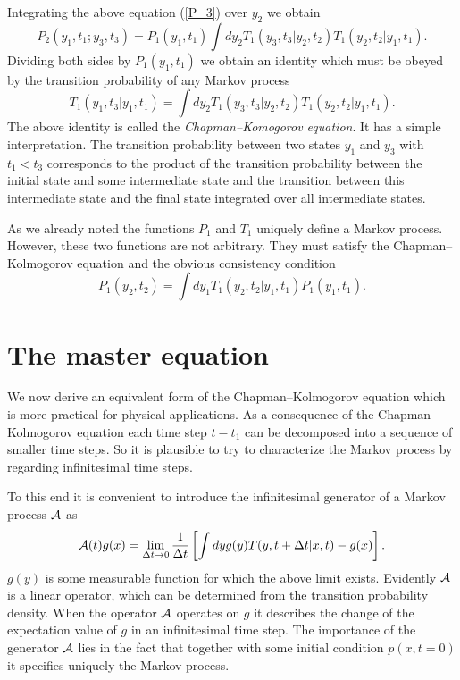 Integrating the above equation (\ref{P_3}) over $y_2$ we obtain 
\begin{equation}
P_2(y_1,t_1;y_3,t_3) = P_1(y_1,t_1) 
       \int dy_2 T_1(y_3,t_3|y_2,t_2) T_1(y_2,t_2|y_1,t_1).
\end{equation}
Dividing both sides by $P_1(y_1,t_1)$ we obtain an identity which 
must be obeyed by the transition probability of any Markov process
\begin{equation}
\label{CHAPMAN_KOLMOGOROV}
T_1(y_1,t_3|y_1,t_1) =  
       \int dy_2 T_1(y_3,t_3|y_2,t_2) T_1(y_2,t_2|y_1,t_1).
\end{equation}
The above identity is called the {\em Chapman--Komogorov 
equation}. It has a simple interpretation. The transition 
probability between two states $y_1$ and $y_3$ with $t_1 <t_3$
corresponds to the product of the transition probability between 
the initial state and some intermediate state and the transition 
between this intermediate state and the final state integrated
over all intermediate states.

As we already noted the functions $P_1$ and $T_1$ uniquely define 
a Markov process. However, these two functions are not arbitrary.
They must satisfy the Chapman--Kolmogorov equation and the obvious
consistency condition
\begin{equation*}
P_1(y_2,t_2) =  
       \int dy_1  T_1(y_2,t_2|y_1,t_1) P_1(y_1,t_1).
\end{equation*}

\section{The master equation}
We now derive an equivalent form of the Chapman--Kolmogorov 
equation which is more practical for physical applications.
As a consequence of the Chapman--Kolmogorov equation each time 
step $t-t_1$ can be decomposed into a sequence of smaller time 
steps. So it is plausible to try to characterize the Markov
process by regarding infinitesimal time steps. 

To this end it is convenient to introduce the infinitesimal 
generator of a Markov process ${\cal{A}}$ as
\begin{equation}
\label{DEF_GENERATOR}
{\cal{A}}(t) g(x) = \lim_{\Delta t \rightarrow 0}
    \frac{1}{\Delta t} 
    \left[\int dy g(y)T(y,t+\Delta t|x,t) - g(x)  \right].
\end{equation}
$g(y)$ is some measurable function for which the above 
limit exists. Evidently ${\cal{A}}$ is a linear operator, which 
can be determined from the transition probability density. 
When the operator ${\cal{A}}$ operates on $g$ it describes the
change of the expectation value of $g$ in an infinitesimal time 
step. The importance of the generator ${\cal{A}}$ lies in the fact
that together with some initial condition $p(x,t=0)$ it specifies
uniquely the Markov process.

